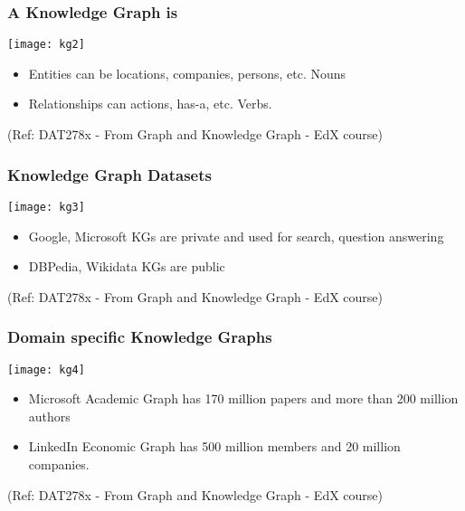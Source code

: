 \begin{frame}\frametitle{A Knowledge Graph is}

\begin{center}
\texttt{[image: kg2]}
\end{center}	

\begin{itemize}
\item Entities can be locations, companies, persons, etc. Nouns
\item Relationships can actions, has-a, etc. Verbs.
\end{itemize}


{\tiny (Ref: DAT278x - From Graph and Knowledge Graph - EdX course)}
\end{frame}

\begin{frame}\frametitle{Knowledge Graph Datasets}

\begin{center}
\texttt{[image: kg3]}
\end{center}	

\begin{itemize}
\item Google, Microsoft KGs are private and used for search, question answering
\item DBPedia, Wikidata KGs are public
\end{itemize}

{\tiny (Ref: DAT278x - From Graph and Knowledge Graph - EdX course)}
\end{frame}

\begin{frame}\frametitle{Domain specific Knowledge Graphs}

\begin{center}
\texttt{[image: kg4]}
\end{center}	


\begin{itemize}
\item Microsoft Academic Graph has 170 million papers and more than 200 million authors
\item LinkedIn Economic Graph has 500 million members and 20 million companies.
\end{itemize}

{\tiny (Ref: DAT278x - From Graph and Knowledge Graph - EdX course)}
\end{frame}


